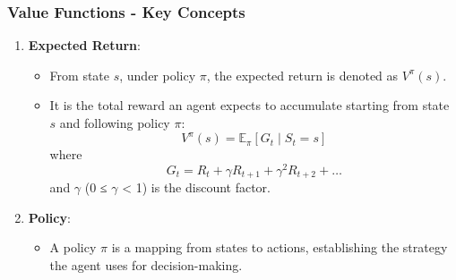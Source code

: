 \documentclass[aspectratio=169]{beamer}
\begin{document}
\begin{frame}[fragile]
    \frametitle{Value Functions - Key Concepts}
    \begin{enumerate}
        \item \textbf{Expected Return}:
        \begin{itemize}
            \item From state \(s\), under policy \(\pi\), the expected return is denoted as \(V^\pi(s)\).
            \item It is the total reward an agent expects to accumulate starting from state \(s\) and following policy \(\pi\):
            \[
            V^\pi(s) = \mathbb{E}_{\pi}\left[ G_t \mid S_t = s \right]
            \]
            where 
            \[
            G_t = R_t + \gamma R_{t+1} + \gamma^2 R_{t+2} + \ldots
            \]
            and \(\gamma\) (0 ≤ \(\gamma\) < 1) is the discount factor.
        \end{itemize}
        
        \item \textbf{Policy}:
        \begin{itemize}
            \item A policy \(\pi\) is a mapping from states to actions, establishing the strategy the agent uses for decision-making.
        \end{itemize}
    \end{enumerate}
\end{frame}
\end{document}
